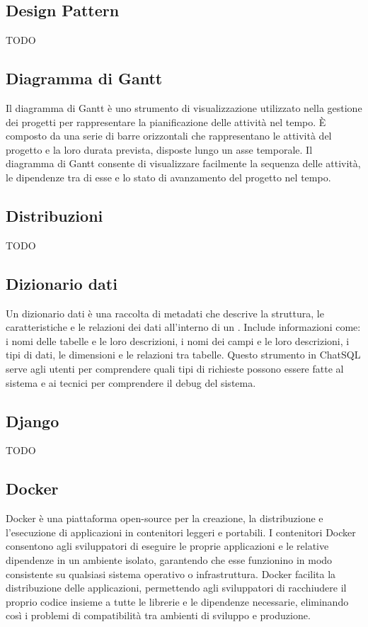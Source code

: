 \subsection*{Design Pattern}
TODO

\vspace{2em}
\subsection*{Diagramma di Gantt}
Il diagramma di Gantt è uno strumento di visualizzazione utilizzato nella gestione dei progetti per rappresentare la pianificazione delle attività nel tempo. È composto da una serie di barre orizzontali che rappresentano le attività del progetto e la loro durata prevista, disposte lungo un asse temporale. Il diagramma di Gantt consente di visualizzare facilmente la sequenza delle attività, le dipendenze tra di esse e lo stato di avanzamento del progetto nel tempo.

\vspace{2em}
\subsection*{Distribuzioni}
TODO

\vspace{2em}
\subsection*{Dizionario dati}
Un dizionario dati è una raccolta di metadati che descrive la struttura, le caratteristiche e le relazioni dei dati all'interno di un . Include informazioni come: i nomi delle tabelle e le loro descrizioni, i nomi dei campi e le loro descrizioni, i tipi di dati, le dimensioni e le relazioni tra tabelle. Questo strumento in ChatSQL serve agli utenti per comprendere quali tipi di richieste possono essere fatte al sistema e ai tecnici per comprendere il debug del sistema.

\vspace{2em}
\subsection*{Django}
TODO

\vspace{2em}
\subsection*{Docker}
Docker è una piattaforma open-source per la creazione, la distribuzione e l'esecuzione di applicazioni in contenitori leggeri e portabili. I contenitori Docker consentono agli sviluppatori di eseguire le proprie applicazioni e le relative dipendenze in un ambiente isolato, garantendo che esse funzionino in modo consistente su qualsiasi sistema operativo o infrastruttura. Docker facilita la distribuzione delle applicazioni, permettendo agli sviluppatori di racchiudere il proprio codice insieme a tutte le librerie e le dipendenze necessarie, eliminando così i problemi di compatibilità tra ambienti di sviluppo e produzione.


